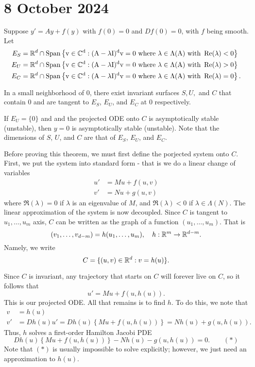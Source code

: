 \documentclass{article}
\begin{document}
\section*{8 October 2024}
    Suppose $y' = Ay + f(y)$ with $f(0) = 0$ and $Df(0) = 0$, with $f$ being smooth. Let 
    \begin{align*}
        E_S &= \mathbb{R}^d \cap \rm{Span} \left\{ v \in \mathbb{C}^d : (A - \lambda I)^d v = 0 \text{ where } \lambda \in \Lambda(A) \text{ with } \Re(\lambda) < 0\right\} \\
        E_U &= \mathbb{R}^d \cap \rm{Span} \left\{ v \in \mathbb{C}^d : (A - \lambda I)^d v = 0 \text{ where } \lambda \in \Lambda(A) \text{ with } \Re(\lambda) > 0\right\} \\
        E_C &= \mathbb{R}^d \cap \rm{Span} \left\{ v \in \mathbb{C}^d : (A - \lambda I)^d v = 0 \text{ where } \lambda \in \Lambda(A) \text{ with } \Re(\lambda) = 0\right\}.
    \end{align*}

    \begin{theorem}{}
        In a small neighborhood of $0$, there exist invariant surfaces $S, U, $ and $C$ that contain 0 and are tangent to $E_S$, $E_U$, and $E_C$ at 0 respectively. 
        \newpar 

        If $E_U = \{0\}$ and and the projected ODE onto $C$ is asymptotically stable (unstable), then $y = 0$ is asymptotically stable (unstable). Note that the dimensions of $S$, $U$, and $C$ are that of $E_S$, $E_U$, and $E_C$. 
    \end{theorem}
    Before proving this theorem, we must first define the porjected system onto $C$. First, we put the system into standard form - that is we do a linear change of variables 
    \begin{align*}
        u' &= Mu + f(u, v) \\
        v' &= Nu + g(u, v)
    \end{align*}
    where $\Re(\lambda) = 0$ if $\lambda$ is an eigenvalue of $M$, and $\Re(\lambda) < 0$ if $\lambda \in \Lambda(N)$. The linear approximation of the system is now decoupled. Since $C$ is tangent to $u_1, \hdots, u_m$ axis, $C$ can be written as the graph of a function $(u_1, \hdots, u_m)$. That is 
    \[
        (v_1, \hdots, v_{d - m}) = h(u_1, \hdots, u_m), \quad h : \mathbb{R}^m \to \mathbb{R}^{d - m}.
    \]
    Namely, we write 
    \[
        C = \{(u, v) \in \mathbb{R}^d : v = h(u)\}.
    \]

    Since $C$ is invariant, any trajectory that starts on $C$ will forever live on $C$, so it follows that 
    \[
        u' = Mu + f(u, h(u)). 
    \]
    This is our projected ODE. All that remains is to find $h$. To do this, we note that 
    \begin{align*}
        v &= h(u) \\
        v' &= Dh(u) u' = Dh(u) \left\{Mu + f(u, h(u))\right\} = Nh(u) + g(u, h(u)).
    \end{align*}
    Thus, $h$ solves a first-order Hamilton Jacobi PDE
    \[
        Dh(u) \left\{Mu + f(u, h(u)) \right\} - Nh(u) - g(u, h(u)) = 0. \qquad (*)
    \]
    Note that $(*)$ is usually impossible to solve explicitly; however, we just need an approximation to $h(u)$. 
\end{document}
